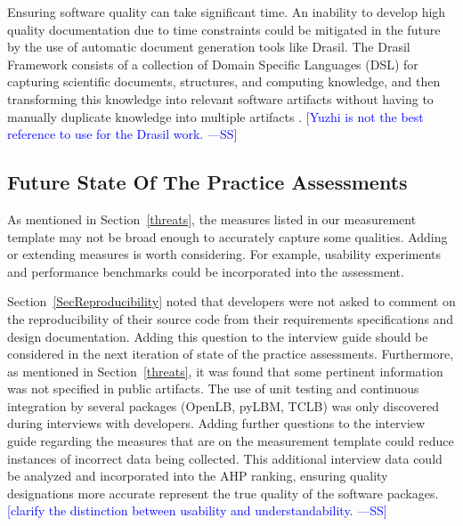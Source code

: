 \documentclass[final, 3p, times, authoryear]{elsarticle}
\newcommand{\authornote}[3]{\textcolor{#1}{[#3 ---#2]}}
\newcommand{\authornote}[3]{}
\newcommand{\wss}[1]{\authornote{blue}{SS}{#1}} %
\begin{document}
Ensuring software quality can take significant time. An inability to develop
high quality documentation due to time constraints could be mitigated in the
future by the use of automatic document generation tools like Drasil. The Drasil
Framework consists of a collection of Domain Specific Languages (DSL) for
capturing scientific documents, structures, and computing knowledge, and then
transforming this knowledge into relevant software artifacts without having to
manually duplicate knowledge into multiple artifacts \citep{zhao2018}.
\wss{Yuzhi is not the best reference to use for the Drasil work.}

\subsection{Future State Of The Practice Assessments} \label{futuresop}

As mentioned in Section~\ref{threats}, the measures listed in our measurement
template may not be broad enough to accurately capture some qualities. Adding or
extending measures is worth considering. For example, usability experiments and
performance benchmarks could be incorporated into the assessment.

Section~\ref{SecReproducibility} noted that developers were not asked to comment
on the reproducibility of their source code from their requirements
specifications and design documentation. Adding this question to the interview
guide should be considered in the next iteration of state of the practice
assessments. Furthermore, as mentioned in Section~\ref{threats}, it was found
that some pertinent information was not specified in public artifacts. The use
of unit testing and continuous integration by several packages (OpenLB, pyLBM,
TCLB) was only discovered during interviews with developers. Adding further
questions to the interview guide regarding the measures that are on the
measurement template could reduce instances of incorrect data being collected.
This additional interview data could be analyzed and incorporated into the AHP
ranking, ensuring quality designations more accurate represent the true quality
of the software packages.  \wss{clarify the distinction between usability and
understandability.}



\end{document}
